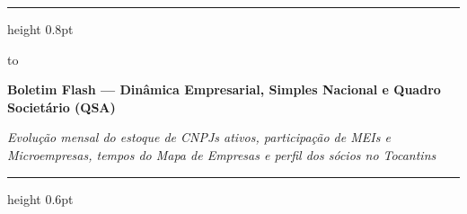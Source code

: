 \documentclass[10pt,a4paper]{article}
\begin{document}
\color{cinzatexto}

%
\par\vspace{2pt}%
{\color{douradoto}\hrule height 0.8pt}%
\par\vspace{6pt}%
\noindent\hbox to %
\par\vspace{5pt}%
{\fontsize{14.5}{17.4}\selectfont\bfseries\color{corprimaria}Boletim Flash — Dinâmica Empresarial, Simples Nacional e Quadro Societário (QSA)\par}%
\vspace{3pt}%
{\footnotesize\itshape\color{cinzasub}Evolução mensal do estoque de CNPJs ativos, participação de MEIs e Microempresas, tempos do Mapa de Empresas e perfil dos sócios no Tocantins\par}%
\par\vspace{6pt}%
{\color{cinzaborda}\hrule height 0.6pt}%

\vspace{0.14cm}
\end{document}
